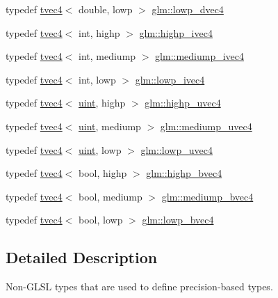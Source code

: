\begin{DoxyCompactItemize}
\item 
typedef \hyperlink{structglm_1_1tvec4}{tvec4}$<$ double, lowp $>$ \hyperlink{group__core__precision_gaed0097453a4f8b1f3dcf7476aee881cd}{glm\+::lowp\+\_\+dvec4}
\item 
typedef \hyperlink{structglm_1_1tvec4}{tvec4}$<$ int, highp $>$ \hyperlink{group__core__precision_ga9303c2a9e1f1e761961eeecbcda2d34f}{glm\+::highp\+\_\+ivec4}
\item 
typedef \hyperlink{structglm_1_1tvec4}{tvec4}$<$ int, mediump $>$ \hyperlink{group__core__precision_ga687eefa63b2c9d0969227eaf23b1ad41}{glm\+::mediump\+\_\+ivec4}
\item 
typedef \hyperlink{structglm_1_1tvec4}{tvec4}$<$ int, lowp $>$ \hyperlink{group__core__precision_ga863ce958bb6c85ab934feeb4a0da5821}{glm\+::lowp\+\_\+ivec4}
\item 
typedef \hyperlink{structglm_1_1tvec4}{tvec4}$<$ \hyperlink{group__core__precision_ga4fd29415871152bfb5abd588334147c8}{uint}, highp $>$ \hyperlink{group__core__precision_gaced82ea2e726f079d4d72cf180a75b8b}{glm\+::highp\+\_\+uvec4}
\item 
typedef \hyperlink{structglm_1_1tvec4}{tvec4}$<$ \hyperlink{group__core__precision_ga4fd29415871152bfb5abd588334147c8}{uint}, mediump $>$ \hyperlink{group__core__precision_ga825e1e6ef3513c5de283d1b2fa1d4879}{glm\+::mediump\+\_\+uvec4}
\item 
typedef \hyperlink{structglm_1_1tvec4}{tvec4}$<$ \hyperlink{group__core__precision_ga4fd29415871152bfb5abd588334147c8}{uint}, lowp $>$ \hyperlink{group__core__precision_ga5bb34ee8aba0f936bc521850819fc762}{glm\+::lowp\+\_\+uvec4}
\item 
typedef \hyperlink{structglm_1_1tvec4}{tvec4}$<$ bool, highp $>$ \hyperlink{group__core__precision_ga12155cf93fb8fea5d9c4c7e2d72aed4e}{glm\+::highp\+\_\+bvec4}
\item 
typedef \hyperlink{structglm_1_1tvec4}{tvec4}$<$ bool, mediump $>$ \hyperlink{group__core__precision_ga92b3f3ba6ecceaea364906ad7ee985a5}{glm\+::mediump\+\_\+bvec4}
\item 
typedef \hyperlink{structglm_1_1tvec4}{tvec4}$<$ bool, lowp $>$ \hyperlink{group__core__precision_ga512926597aea7a1afe60ee7b983db86d}{glm\+::lowp\+\_\+bvec4}
\end{DoxyCompactItemize}


\subsection{Detailed Description}
Non-\/\+G\+L\+SL types that are used to define precision-\/based types. 

